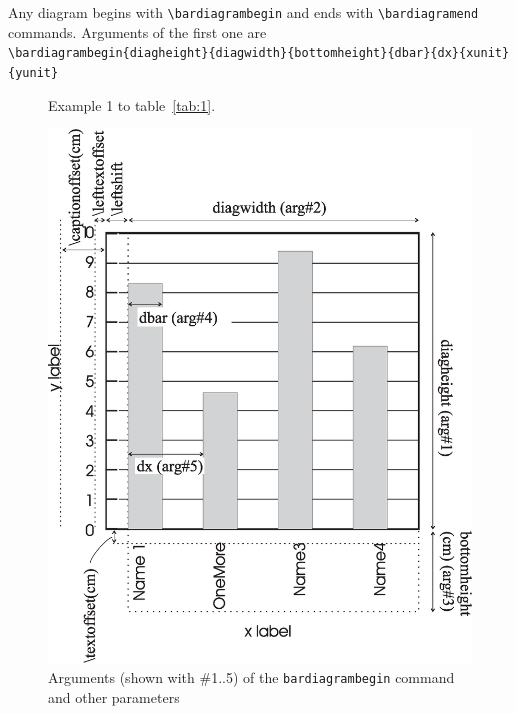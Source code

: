 \documentclass[12pt]{article}
\begin{document}
Any diagram begins with \verb+\bardiagrambegin+ 
and ends with
\verb+\bardiagramend+ 
commands. Arguments of the first one are\\
\verb+\bardiagrambegin{diagheight}{diagwidth}{bottomheight}{dbar}{dx}{xunit}{yunit}+

\begin{figure}[t]\centering
  
\caption{\label{fig:1} Example 1 to table~\ref{tab:1}.}
\end{figure}

\begin{figure}[t]\centering
  \includegraphics[scale=0.5]{figs/diag.eps}
  \caption{\label{fig:2} Arguments (shown with \#1..5) of the
    \texttt{bardiagrambegin} command and other parameters}
\end{figure}
\end{document}
